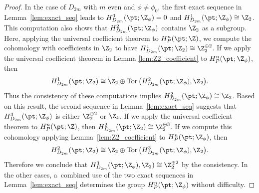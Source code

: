 \begin{proof}
In the case of $D_{2m}$ with $m$ even and $\phi \neq \phi_0$, the f\/irst exact sequence in Lemma~\ref{lem:exact_seq} leads to $H^0_{D_{2m}}(\pt; \Z_\phi) = 0$ and $H^1_{D_{2m}}(\pt; \Z_\phi) \cong \Z_2$. This computation also shows that $H^2_{D_{2m}}(\pt; \Z_\phi)$ contains $\Z_2$ as a subgroup. Here, applying the universal coef\/f\/icient theorem to $H^n_P(\pt; \Z)$, we compute the cohomology with coef\/f\/icients in $\Z_2$ to have $H^1_{D_{2m}}(\pt; \Z_2) \cong \Z_2^{\oplus 2}$. If we apply the universal coef\/f\/icient theorem in Lemma \ref{lem:Z2_coefficient} to $H^n_P(\pt; \Z_\phi)$, then
\begin{gather*}
H^1_{D_{2m}}(\pt; \Z_2) \cong \Z_2 \oplus \operatorname{Tor}\big(H^2_{D_{2m}}(\pt; \Z_\phi), \Z_2\big).
\end{gather*}
Thus the consistency of these computations implies $H^2_{D_{2m}}(\pt; \Z_\phi) \cong \Z_2$. Based on this result, the second sequence in Lemma~\ref{lem:exact_seq} suggests that $H^3_{D_{2m}}(\pt; \Z_\phi)$ is either $\Z_2^{\oplus 2}$ or $\Z_4$. If we apply the universal coef\/f\/icient theorem to $H^n_P(\pt; \Z)$, then $H^2_{D_{2m}}(\pt; \Z_2) \cong \Z_2^{\oplus 3}$. If we compute this cohomology applying Lemma~\ref{lem:Z2_coefficient} to $H^n_P(\pt; \Z_\phi)$, then
\begin{gather*}
H^2_{D_{2m}}(\pt; \Z_2) \cong \Z_2 \oplus \operatorname{Tor}\big(H^3_{D_{2m}}(\pt; \Z_\phi), \Z_2\big).
\end{gather*}
Therefore we conclude that $H^3_{D_{2m}}(\pt; \Z_\phi), \Z_2) \cong \Z_2^{\oplus 2}$ by the consistency. In the other cases, a~combined use of the two exact sequences in Lemma~\ref{lem:exact_seq} determines the group $H^n_P(\pt; \Z_\phi)$ without dif\/f\/iculty.
\end{proof}
